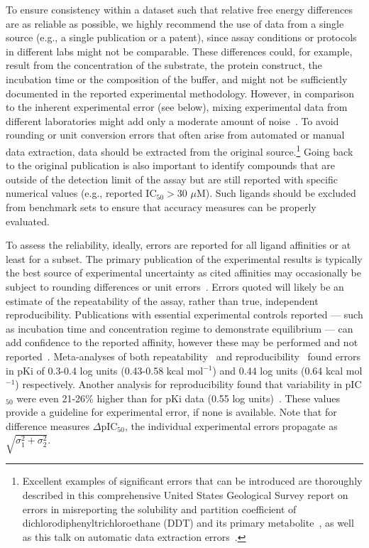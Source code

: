 \documentclass[9pt,bestpractices]{livecoms}
\begin{document}
To ensure consistency within a dataset such that relative free energy differences are as reliable as possible, we highly recommend the use of data from a single source (e.g., a single publication or a patent), since assay conditions or protocols in different labs might not be comparable. 
These differences could, for example, result from the concentration of the substrate, the protein construct, the incubation time or the composition of the buffer, and might not be sufficiently documented in the reported experimental methodology. However, in comparison to the inherent experimental error (see below), mixing experimental data from different laboratories might add only a moderate amount of noise~\cite{kalliokoski_comparability_2013}.
To avoid rounding or unit conversion errors that often arise from automated or manual data extraction, data should be extracted from the original source.\footnote{Excellent examples of significant errors that can be introduced are thoroughly described in this comprehensive United States Geological Survey report on errors in misreporting the solubility and partition coefficient of dichlorodiphenyltrichloroethane (DDT) and its primary metabolite~\cite{pontolillo2001search}, as well as this talk on automatic data extraction errors~\cite{daga_pankaj_r_2019_3445476}.}
Going back to the original publication is also important to identify compounds that are outside of the detection limit of the assay but are still reported with specific numerical values (e.g., reported IC$_{50} > 30 \,\,\mu$M). Such ligands should be excluded from benchmark sets to ensure that accuracy measures can be properly evaluated.

To assess the reliability, ideally, errors are reported for all ligand affinities or at least for a subset. The primary publication of the experimental results is typically the best source of experimental uncertainty as cited affinities may occasionally be subject to rounding differences or unit errors~\cite{kramer2012experimental}. Errors quoted will likely be an estimate of the repeatability of the assay, rather than true, independent reproducibility. Publications with essential experimental controls reported --- such as incubation time and concentration regime to demonstrate equilibrium --- can add confidence to the reported affinity, however these may be performed and not reported~\cite{jarmoskaite2020measure}. Meta-analyses of both repeatability~\cite{sheridan2020experimental} and reproducibility~\cite{kramer2012experimental} found errors in pKi of 0.3-0.4 log units (0.43-0.58 kcal mol$^{-1}$) and 0.44 log units (0.64 kcal mol$^{-1}$) respectively.  Another analysis for reproducibility found that variability in pIC$_{50}$ were even 21-26\% higher than for pKi data (0.55 log units)~\cite{kalliokoski_comparability_2013}. These values provide a guideline for experimental error, if none is available. Note that for difference measures $\Delta $pIC$_{50}$, the individual experimental errors propagate as $\sqrt{\sigma_1^2+\sigma_2^2}$.
\end{document}
